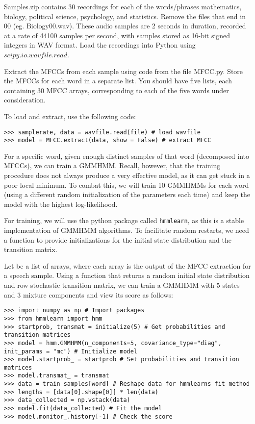 \begin{problem}
Samples.zip contains 30 recordings for each of the words/phrases mathematics, biology, political science, psychology, and statistics. 
Remove the files that end in 00 (eg. Biology00.wav).
These audio samples are 2 seconds in
duration, recorded at a rate of 44100 samples per second, with samples stored as 16-bit signed
integers in WAV format. 
Load the recordings into Python using $scipy.io.wavfile.read$.

Extract the MFCCs from each sample using code from the file MFCC.py.
Store the MFCCs for each word in a separate list. 
You should have five lists, each containing
30 MFCC arrays, corresponding to each of the five words under consideration. 

To load and extract, use the following code:

\begin{lstlisting}
>>> samplerate, data = wavfile.read(file) # load wavfile 
>>> model = MFCC.extract(data, show = False) # extract MFCC
\end{lstlisting}
\end{problem}

For a specific word, given enough distinct samples of that word (decomposed into MFCCs), we can train a GMMHMM.
Recall, however, that the training procedure does not always produce a very effective model, as it can get stuck in a poor local minimum. 
To combat this, we will train 10 GMMHMMs for each word (using a different random initialization of the parameters each time)
and keep the model with the highest log-likelihood.

For training, we will use the python package called {\tt hmmlearn}, as this is a stable implementation of GMMHMM algorithms.
To facilitate random restarts, we need a function to provide initializations for the initial state distribution and the transition matrix.

Let  be a list of arrays, where each array is the output of the MFCC extraction for a speech sample.
Using a function  that returns a random initial state distribution and row-stochastic transition matrix, we can train a GMMHMM with $5$ states
and $3$ mixture components and view its score as follows:
\begin{lstlisting}
>>> import numpy as np # Import packages 
>>> from hmmlearn import hmm
>>> startprob, transmat = initialize(5) # Get probabilities and transition matrices 
>>> model = hmm.GMMHMM(n_components=5, covariance_type="diag", init_params = "mc") # Initialize model
>>> model.startprob_ = startprob # Set probabilities and transition matrices 
>>> model.transmat_ = transmat
>>> data = train_samples[word] # Reshape data for hmmlearns fit method
>>> lengths = [data[0].shape[0]] * len(data)
>>> data_collected = np.vstack(data)
>>> model.fit(data_collected) # Fit the model
>>> model.monitor_.history[-1] # Check the score
\end{lstlisting}

